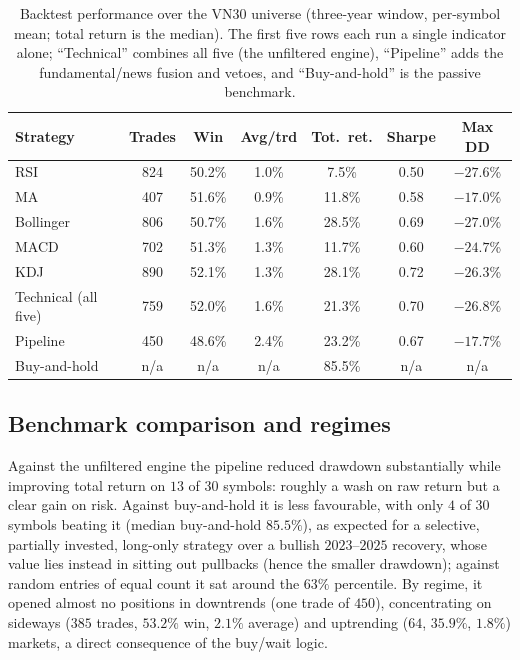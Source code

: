\documentclass[runningheads]{llncs}
\begin{document}
\begin{table}[t]
\centering
\caption{Backtest performance over the VN30 universe (three-year window,
per-symbol mean; total return is the median). The first five rows each run a
single indicator alone; ``Technical'' combines all five (the unfiltered engine),
``Pipeline'' adds the fundamental/news fusion and vetoes, and ``Buy-and-hold'' is
the passive benchmark.}
\label{tab:indicators}
\setlength{\tabcolsep}{4pt}
\small
\begin{tabular}{@{}lcccccc@{}}
\toprule
Strategy & Trades & Win & Avg/trd & Tot.\ ret. & Sharpe & Max DD \\
\midrule
RSI            & 824 & 50.2\% & 1.0\% & 7.5\%  & 0.50 & $-27.6$\% \\
MA             & 407 & 51.6\% & 0.9\% & 11.8\% & 0.58 & $-17.0$\% \\
Bollinger      & 806 & 50.7\% & 1.6\% & 28.5\% & 0.69 & $-27.0$\% \\
MACD           & 702 & 51.3\% & 1.3\% & 11.7\% & 0.60 & $-24.7$\% \\
KDJ            & 890 & 52.1\% & 1.3\% & 28.1\% & 0.72 & $-26.3$\% \\
\midrule
Technical (all five) & 759 & 52.0\% & 1.6\% & 21.3\% & 0.70 & $-26.8$\% \\
Pipeline       & 450 & 48.6\% & 2.4\% & 23.2\% & 0.67 & $-17.7$\% \\
Buy-and-hold   & n/a & n/a    & n/a   & 85.5\% & n/a  & n/a       \\
\bottomrule
\end{tabular}
\end{table}

\subsection{Benchmark comparison and regimes}
Against the unfiltered engine the pipeline reduced drawdown substantially while
improving total return on $13$ of $30$ symbols: roughly a wash on raw return but a
clear gain on risk. Against buy-and-hold it is less favourable, with only $4$ of
$30$ symbols beating it (median buy-and-hold $85.5\%$), as expected for a
selective, partially invested, long-only strategy over a bullish $2023$--$2025$
recovery, whose value lies instead in sitting out pullbacks (hence the smaller
drawdown); against random entries of equal count it sat around the $63\%$
percentile. By
regime, it opened almost no positions in downtrends (one trade of $450$),
concentrating on sideways ($385$ trades, $53.2\%$ win, $2.1\%$ average) and
uptrending ($64$, $35.9\%$, $1.8\%$) markets, a direct consequence of the
buy/wait logic.
\end{document}
